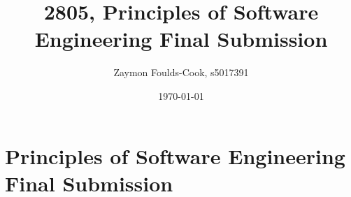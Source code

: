 \documentclass[12pt, a4]{report}
\title{2805, Principles of Software Engineering Final Submission}
\author{Zaymon Foulds-Cook, s5017391}%
\date{\today}
\begin{document}
\begin{titlepage}
	\maketitle
\end{titlepage}

\tableofcontents
\pagebreak

%
%
\section{Principles of Software Engineering Final Submission}


	

\end{document}
